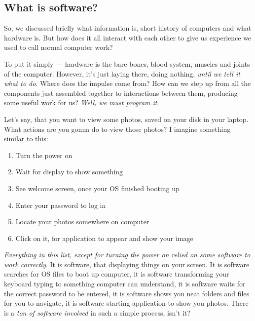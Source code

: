 \documentclass[../../why-computer.tex]{subfiles}
\begin{document}
	\subsection{What is software?}\label{subsection:what-is-software}
        So, we discussed briefly what information is, short history of computers and what hardware is. But how does it all interact with each other to give us experience
        we used to call normal computer work? \par

        To put it simply --- hardware is the bare bones, blood system, muscles and joints of the computer. However, it's just laying there, doing nothing, \emph{until we tell it 
        what to do}. Where does the impulse come from? How can we step up from all the components just assembled together to interactions between them, producing some
        useful work for us? \emph{Well, we must program it}. \par

        Let's say, that you want to view some photos, saved on your disk in your laptop. What actions are you gonna do to view those photos? I imagine something similar to
        this: 

        \begin{enumerate}
        \item Turn the power on
        \item Wait for display to show something
        \item See welcome screen, once your OS finished booting up
        \item Enter your password to log in
        \item Locate your photos somewhere on computer
        \item Click on it, for application to appear and show your image
        \end{enumerate}

        \emph{Everything in this list, except for turning the power on relied on some software to work correctly}. It is software, that displaying things on your screen.
        It is software searches for OS files to boot up computer, it is software transforming your keyboard typing to something computer can understand, it is software
        waits for the correct password to be entered, it is software shows you neat folders and files for you to navigate, it is software starting application to show you
        photos. There is a \emph{ton of software involved} in such a simple process, isn't it? \par
\end{document}
